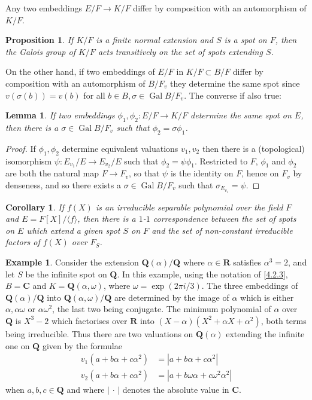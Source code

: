 \documentclass[10pt,leqno]{article}
\newtheorem{prop}[theo]{Proposition}
\newtheorem{lemm}[theo]{Lemma}
\newtheorem{coro}[theo]{Corollary}
\theoremstyle{definition}
\newtheorem{exam}[theo]{Example}
\def\<{\langle}
\def\>{\rangle}
\def\QQ{\mathbf{Q}}
\def\RR{\mathbf{R}}
\def\CC{\mathbf{C}}
\DeclareMathOperator{\Gal}{Gal}
\begin{document}
Any two embeddings $E/F \to K/F$ differ by composition with an automorphism of $K/F$.


\begin{prop}
\label{4.2.4}
If $K/F$ is a finite normal extension and $S$ is a spot on $F$, then the Galois group of $K/F$ acts transitively on the set of spots extending $S$.
\end{prop}


On the other hand, if two embeddings of $E/F$ in $K/F \subset B/F$ differ by composition with an automorphism of $B/F_v$ they determine the same spot since $v(\sigma(b)) = v(b)$ for all $b \in B, \sigma \in \Gal B/F_v$.
The converse if also true:


\begin{lemm}
\label{4.2.5}
If two embeddings $\phi_1,\phi_2 : E/F \to K/F$ determine the same spot on $E$, then there is a $\sigma \in \Gal B/F_v$ such that $\phi_2 = \sigma\phi_1$.
\end{lemm}

\begin{proof}
If $\phi_1,\phi_2$ determine equivalent valuations $v_1,v_2$ then there is a (topological) isomorphism $\psi : E_{v_1} / E \to E_{v_2}/E$ such that $\phi_2 = \psi\phi_1$.
Restricted to $F$, $\phi_1$ and $\phi_2$ are both the natural map $F \to F_v$, so that $\psi$ is the identity on $F$, hence on $F_v$ by denseness, and so there exists a $\sigma \in \Gal B/F_v$ such that $\sigma_{E_{v_1}} = \psi$.
\end{proof}


\begin{coro}
\label{4.2.6}
If $f(X)$ is an irreducible separable polynomial over the field $F$ and $E = F[X] / \< f \>$, then there is a $1$-$1$ correspondence between the set of spots on $E$ which extend a given spot $S$ on $F$ and the set of non-constant irreducible factors of $f(X)$ over $F_S$.
\end{coro}


\begin{exam}
\label{4.2.7}
Consider the extension $\QQ(\alpha)/\QQ$ where $\alpha \in \RR$ satisfies $\alpha^3 = 2$, and let $S$ be the infinite spot on $\QQ$.
In this example, using the notation of \ref{4.2.3}, $B = \CC$ and $K = \QQ(\alpha,\omega)$, where $\omega = \exp(2 \pi i / 3)$.
The three embeddings of $\QQ(\alpha)/\QQ$ into $\QQ(\alpha,\omega)/\QQ$ are determined by the image of $\alpha$ which is either $\alpha, \alpha\omega$ or $\alpha\omega^2$, the last two being conjugate.
The minimum polynomial of $\alpha$ over $\QQ$ is $X^3-2$ which factorises over $\RR$ into $(X-\alpha)(X^2 + \alpha X + \alpha^2)$, both terms being irreducible.
Thus there are two valuations on $\QQ(\alpha)$ extending the infinite one on $\QQ$ given by the formulae
\begin{align*}
v_1(a + b\alpha + c\alpha^2) &= |a + b\alpha + c\alpha^2|
\\
v_2(a + b\alpha + c\alpha^2) &= |a + b\omega\alpha + c\omega^2\alpha^2|
\end{align*}
when $a,b,c \in \QQ$ and where $|\,\cdot\,|$ denotes the absolute value in $\CC$.
\end{exam}
\end{document}
